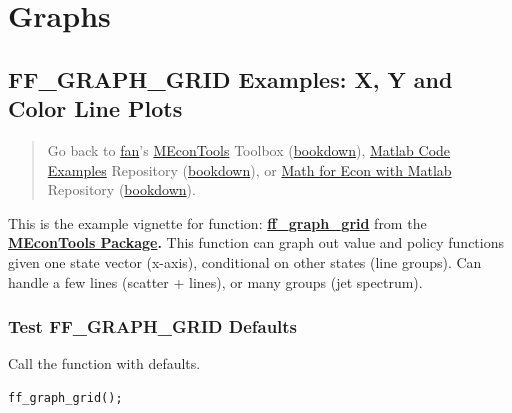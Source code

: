 \documentclass[
]{book}
\begin{document}
\hypertarget{graphs}{%
\chapter{Graphs}\label{graphs}}

\hypertarget{ff_graph_grid-examples-x-y-and-color-line-plots}{%
\section{FF\_GRAPH\_GRID Examples: X, Y and Color Line Plots}\label{ff_graph_grid-examples-x-y-and-color-line-plots}}

\begin{quote}
Go back to \href{http://fanwangecon.github.io/}{fan}'s \href{https://fanwangecon.github.io/MEconTools/}{MEconTools} Toolbox (\href{https://fanwangecon.github.io/MEconTools/bookdown}{bookdown}), \href{https://fanwangecon.github.io/M4Econ/}{Matlab Code Examples} Repository (\href{https://fanwangecon.github.io/M4Econ/bookdown}{bookdown}), or \href{https://fanwangecon.github.io/Math4Econ/}{Math for Econ with Matlab} Repository (\href{https://fanwangecon.github.io/Math4Econ/bookdown}{bookdown}).
\end{quote}

This is the example vignette for function:
\href{https://github.com/FanWangEcon/MEconTools/blob/master/MEconTools/graph/ff_graph_grid.m}{\textbf{ff\_graph\_grid}}
from the \href{https://fanwangecon.github.io/MEconTools/}{\textbf{MEconTools
Package}}\textbf{.} This function
can graph out value and policy functions given one state vector
(x-axis), conditional on other states (line groups). Can handle a few
lines (scatter + lines), or many groups (jet spectrum).

\hypertarget{test-ff_graph_grid-defaults}{%
\subsection{Test FF\_GRAPH\_GRID Defaults}\label{test-ff_graph_grid-defaults}}

Call the function with defaults.

\begin{verbatim}
ff_graph_grid();
\end{verbatim}
\end{document}
